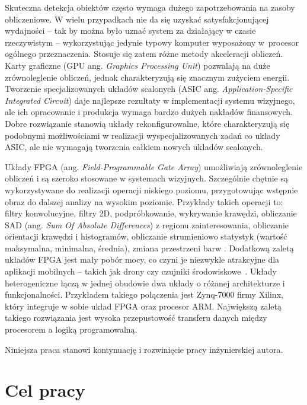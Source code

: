 Skuteczna detekcja obiektów często wymaga dużego zapotrzebowania na zasoby obliczeniowe.
W wielu przypadkach nie da się uzyskać satysfakcjonującej wydajności -- tak by można było uznać system za działający w czasie rzeczywistym -- wykorzystując jedynie typowy komputer wyposażony w~procesor ogólnego przeznaczenia.
Stosuje się zatem różne metody akceleracji obliczeń.
Karty graficzne (GPU ang. \textit{Graphics Processing Unit}) pozwalają na duże zrównoleglenie obliczeń, jednak charakteryzują się znacznym zużyciem energii. %
Tworzenie specjalizowanych układów scalonych (ASIC ang. \textit{Application-Specific Integrated Circuit}) daje najlepsze rezultaty w implementacji systemu wizyjnego, ale ich opracowanie i produkcja wymaga bardzo dużych nakładów finansowych. %
Dobre rozwiązanie stanowią układy rekonfigurowalne, które charakteryzują się podobnymi możliwościami w realizacji wyspecjalizowanych zadań co układy ASIC, ale nie wymagają tworzenia całkiem nowych układów scalonych. %

Układy FPGA (ang. \textit{Field-Programmable Gate Array}) umożliwiają zrównoleglenie obliczeń i są szeroko stosowane w systemach wizyjnych.
Szczególnie chętnie są wykorzystywane do realizacji operacji niskiego poziomu, przygotowując wstępnie obraz do dalszej analizy na wysokim poziomie.
Przykłady takich operacji to: filtry konwolucyjne, filtry 2D, podpróbkowanie, wykrywanie krawędzi, obliczanie SAD (ang. \textit{Sum Of Absolute Differences}) z regionu zainteresowania, obliczanie orientacji krawędzi i histogramów, obliczanie strumieniowo statystyk (wartość maksymalna, minimalna, średnia), zmiana przestrzeni barw \cite{kisacanin2008embedded}. %
Dodatkową zaletą układów FPGA jest mały pobór mocy, co czyni je niezwykle atrakcyjne dla aplikacji mobilnych -- takich jak drony czy czujniki środowiskowe~\cite{garcia2014survey}.
Układy heterogeniczne łączą w jednej obudowie dwa układy o różanej architekturze i funkcjonalności.
Przykładem takiego połączenia jest Zynq-7000 firmy Xilinx, który integruje w sobie układ FPGA oraz procesor ARM.
Największą zaletą takiego rozwiązania jest wysoka przepustowość transferu danych między procesorem a logiką programowalną.

Niniejsza praca stanowi kontynuację i rozwinięcie pracy inżynierskiej autora.

\section{Cel pracy}

